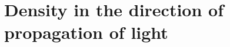 










\section{Density in the direction of propagation of light}\label{sect: Density the in direction of propagation of light}


